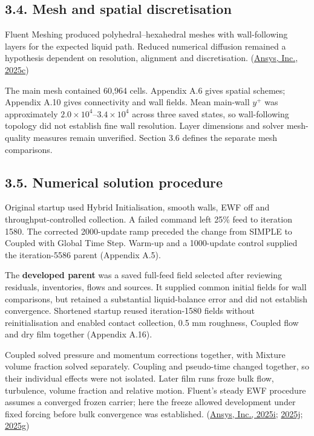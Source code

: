 \documentclass[
  12pt,
  a4paper,
]{article}
\begin{document}
\subsection{3.4. Mesh and spatial
discretisation}\label{mesh-and-spatial-discretisation}

Fluent Meshing produced polyhedral--hexahedral meshes with
wall-following layers for the expected liquid path. Reduced numerical
diffusion remained a hypothesis dependent on resolution, alignment and
discretisation.
(\href{https://ansyshelp.ansys.com/public/Views/Secured/corp/v252/en/flu_ug/flu_ug_GridTypes.html}{Ansys,
Inc., 2025c})

The main mesh contained 60,964 cells. Appendix A.6 gives spatial
schemes; Appendix A.10 gives connectivity and wall fields. Mean
main-wall \(y^+\) was approximately \(2.0\times10^4\)--\(3.4\times10^4\)
across three saved states, so wall-following topology did not establish
fine wall resolution. Layer dimensions and solver mesh-quality measures
remain unverified. Section 3.6 defines the separate mesh comparisons.

\subsection{3.5. Numerical solution
procedure}\label{numerical-solution-procedure}

Original startup used Hybrid Initialisation, smooth walls, EWF off and
throughput-controlled collection. A failed command left 25\% feed to
iteration 1580. The corrected 2000-update ramp preceded the change from
SIMPLE to Coupled with Global Time Step. Warm-up and a 1000-update
control supplied the iteration-5586 parent (Appendix A.5).

The \textbf{developed parent} was a saved full-feed field selected after
reviewing residuals, inventories, flows and sources. It supplied common
initial fields for wall comparisons, but retained a substantial
liquid-balance error and did not establish convergence. Shortened
startup reused iteration-1580 fields without reinitialisation and
enabled contact collection, 0.5 mm roughness, Coupled flow and dry film
together (Appendix A.16).

Coupled solved pressure and momentum corrections together, with Mixture
volume fraction solved separately. Coupling and pseudo-time changed
together, so their individual effects were not isolated. Later film runs
froze bulk flow, turbulence, volume fraction and relative motion.
Fluent's steady EWF procedure assumes a converged frozen carrier; here
the freeze allowed development under fixed forcing before bulk
convergence was established.
(\href{https://ansyshelp.ansys.com/public/Views/Secured/corp/v252/en/flu_ug/flu_ug_sec_uns_solve_pvel_1.html}{Ansys,
Inc., 2025i};
\href{https://ansyshelp.ansys.com/public/Views/Secured/corp/v252/en/flu_ug/flu_ug_sec_multiphase_solution.html}{2025j};
\href{https://ansyshelp.ansys.com/public/Views/Secured/corp/v252/en/flu_th/flu_th_ewf_sec_sol_alg.html}{2025g})
\end{document}
